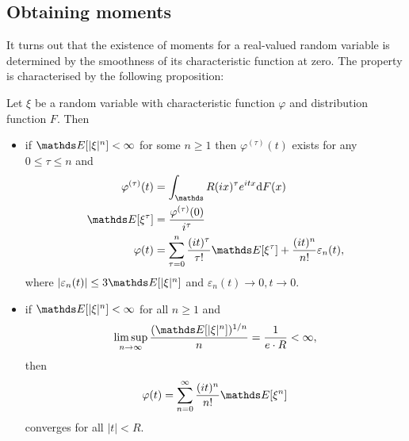 \subsection{Obtaining moments}
It turns out that the existence of moments for a real-valued random variable is determined by the smoothness of its characteristic function at zero. The property is characterised by the following proposition:
\begin{proposition}[Moments]
Let $\xi$ be a random variable with characteristic function $\varphi$ and distribution function $F$. Then
\begin{itemize}
    \item if $\E[|\xi|^n] < \infty$ for some $n \ge 1$ then $\varphi^{(\tau)}(t)$ exists for any $0 \le \tau \le n$ and 
    \begin{align*}
        \varphi^{(\tau)}(t) &= \int_\R (ix)^\tau e^{itx} \d F(x)\\
        \E[\xi^\tau] &= \frac{\varphi^{(\tau)}(0)}{i^\tau}\\
        \varphi(t) &= \sum_{\tau=0}^n \frac{(it)^\tau}{\tau!} \E[\xi ^\tau] + \frac{(it)^n}{n!}\varepsilon_n(t),
    \end{align*}
    where $|\varepsilon_n(t)| \le 3 \E[|\xi|^n]$ and $\varepsilon_n(t) \to 0, t \to 0$.
    \item if $\E[|\xi|^n] < \infty$ for all $n\ge 1$ and
    \begin{equation}
        \limsup_{n \to \infty} \frac{(\E[|\xi|^n])^{1/n}}{n} = \frac{1}{e \cdot R} < \infty,
    \end{equation}
    then
    \begin{equation*}
        \varphi(t) = \sum_{n=0}^\infty \frac{(it)^n}{n!}\E[\xi^n]
    \end{equation*}
    converges for all $|t| < R$.
\end{itemize}
\end{proposition}

